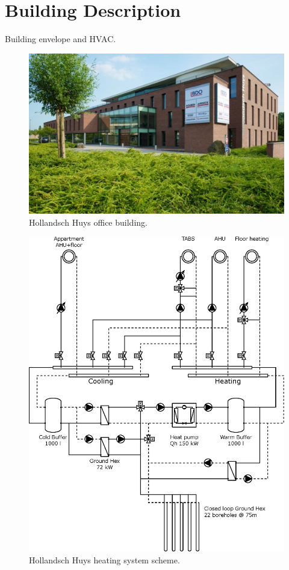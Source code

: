 \documentclass[10pt]{extarticle}
\begin{document}
\section{Building Description}\label{sec:building}
Building envelope and HVAC.
% 
\begin{figure}[htbp]
\centering
\includegraphics[width=0.80 \textwidth]{fig/HH_building.eps}
\caption{Hollandsch Huys office building.
}
\label{fig:approxMPC:TDNN}
\end{figure}
%
\begin{figure}[htbp]
\centering
\includegraphics[width=0.80 \textwidth]{fig/HH_HVAC.eps}
\caption{Hollandsch Huys heating system scheme.
}
\label{fig:approxMPC:TDNN}
\end{figure}
\end{document}
